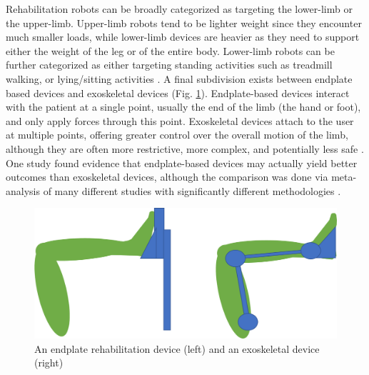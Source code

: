 \documentclass[12pt]{report}
\begin{document}
	Rehabilitation robots can be broadly categorized as targeting the lower-limb or the upper-limb. Upper-limb robots tend to be lighter weight since they encounter much smaller loads, while lower-limb devices are heavier as they need to support either the weight of the leg or of the entire body. Lower-limb robots can be further categorized as either targeting standing activities such as treadmill walking, or lying/sitting activities \cite{Calabro2016}. A final subdivision exists between endplate based devices and exoskeletal devices (Fig. \ref{fig:end_exo}). Endplate-based devices interact with the patient at a single point, usually the end of the limb (the hand or foot), and only apply forces through this point. Exoskeletal devices attach to the user at multiple points, offering greater control over the overall motion of the limb, although they are often more restrictive, more complex, and potentially less safe \cite{Chang2013}. One study found evidence that endplate-based devices may actually yield better outcomes than exoskeletal devices, although the comparison was done via meta-analysis of many different studies with significantly different methodologies \cite{Mehrholz2012} . 
	
	
	\begin{figure}[h] 
		\centering
		\includegraphics[width=0.8\linewidth]{endplate_exoskeleton}
		\caption{An endplate rehabilitation device (left) and an exoskeletal device (right)}
		\label{fig:end_exo}
	\end{figure}
\end{document}
